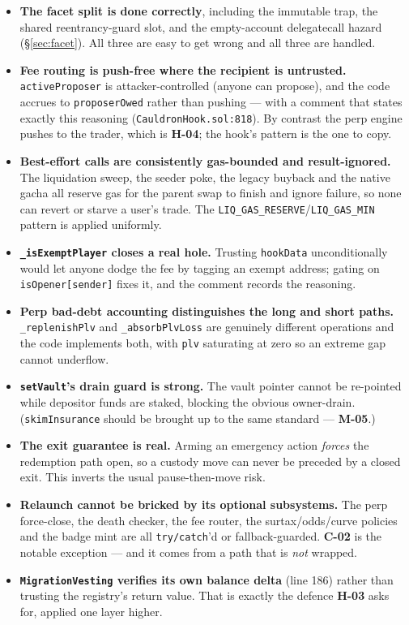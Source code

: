 \documentclass[10pt,a4paper]{article}
\newcommand{\code}[1]{\texttt{\small #1}}
\begin{document}
\begin{itemize}
\item \textbf{The facet split is done correctly}, including the immutable trap,
the shared reentrancy-guard slot, and the empty-account delegatecall hazard
(\S\ref{sec:facet}). All three are easy to get wrong and all three are handled.

\item \textbf{Fee routing is push-free where the recipient is untrusted.}
\code{activeProposer} is attacker-controlled (anyone can propose), and the code
accrues to \code{proposerOwed} rather than pushing --- with a comment that
states exactly this reasoning (\code{CauldronHook.sol:818}). By contrast the
perp engine pushes to the trader, which is \textbf{H-04}; the hook's pattern is
the one to copy.

\item \textbf{Best-effort calls are consistently gas-bounded and
result-ignored.} The liquidation sweep, the seeder poke, the legacy buyback and
the native gacha all reserve gas for the parent swap to finish and ignore
failure, so none can revert or starve a user's trade. The
\code{LIQ\_GAS\_RESERVE}/\code{LIQ\_GAS\_MIN} pattern is applied uniformly.

\item \textbf{\code{\_isExemptPlayer} closes a real hole.} Trusting
\code{hookData} unconditionally would let anyone dodge the fee by tagging an
exempt address; gating on \code{isOpener[sender]} fixes it, and the comment
records the reasoning.

\item \textbf{Perp bad-debt accounting distinguishes the long and short paths.}
\code{\_replenishPlv} and \code{\_absorbPlvLoss} are genuinely different
operations and the code implements both, with \code{plv} saturating at zero so
an extreme gap cannot underflow.

\item \textbf{\code{setVault}'s drain guard is strong.} The vault pointer cannot
be re-pointed while depositor funds are staked, blocking the obvious
owner-drain. (\code{skimInsurance} should be brought up to the same standard ---
\textbf{M-05}.)

\item \textbf{The exit guarantee is real.} Arming an emergency action
\emph{forces} the redemption path open, so a custody move can never be preceded
by a closed exit. This inverts the usual pause-then-move risk.

\item \textbf{Relaunch cannot be bricked by its optional subsystems.} The perp
force-close, the death checker, the fee router, the surtax/odds/curve policies
and the badge mint are all \code{try/catch}'d or fallback-guarded. \textbf{C-02}
is the notable exception --- and it comes from a path that is \emph{not} wrapped.

\item \textbf{\code{MigrationVesting} verifies its own balance delta}
(line 186) rather than trusting the registry's return value. That is exactly the
defence \textbf{H-03} asks for, applied one layer higher.
\end{itemize}
\end{document}
